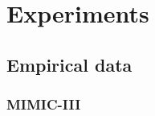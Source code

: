 \documentclass[
]{article}
\begin{document}
\hypertarget{experiments}{%
\section{Experiments}\label{experiments}}

\label{sec:experiments}

\hypertarget{empirical-data}{%
\subsection{Empirical data}\label{empirical-data}}

\label{sec:data}

\hypertarget{mimic-iii}{%
\subsubsection{MIMIC-III}\label{mimic-iii}}

\label{sec:mimic}
\end{document}
